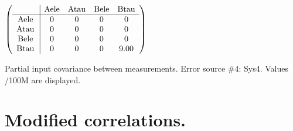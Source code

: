 \begin{table}[H]
\scriptsize
\begin{center}
\renewcommand{\arraystretch}{1.1}
\begin{math}\left(\begin{array}{c|cccc}
 & \mathrm{Aele} & 
\mathrm{Atau} & 
\mathrm{Bele} & 
\mathrm{Btau} \\
\hline
\mathrm{Aele} \hspace*{2pt} &  0 &  0 &  0 &  0 \\
\mathrm{Atau} \hspace*{2pt} &  0 &  0 &  0 &  0 \\
\mathrm{Bele} \hspace*{2pt} &  0 &  0 &  0 &  0 \\
\mathrm{Btau} \hspace*{2pt} &  0 &  0 &  0 &       9.00 \\
\end{array}\right)\end{math}
\caption{Partial input covariance between measurements. Error source \#4: Sys4. Values /100M are displayed.}
\renewcommand{\arraystretch}{1}
\end{center}
\end{table}
\clearpage
\section{Modified correlations.}
